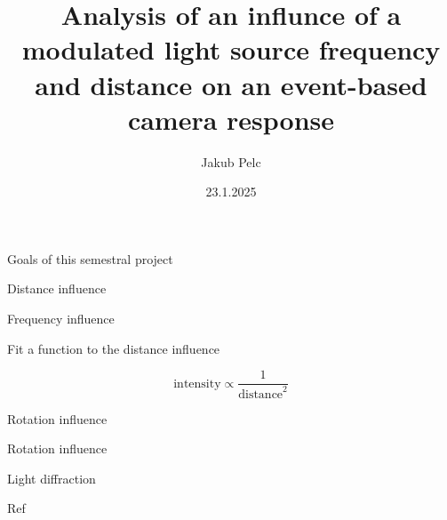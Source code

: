 \documentclass{beamer}
\title{Analysis of an influnce of a modulated light source frequency
and distance on an event-based camera response}
\date{23.1.2025}
\author{Jakub Pelc}
\institute{Faculty of Electrical Engineering, Czech Technical University in Prague}
\begin{document}
	\maketitle

	\begin{frame}{Goals of this semestral project}
	\end{frame}

	\begin{frame}{Distance influence}
	\end{frame}

	\begin{frame}{Frequency influence}
	\end{frame}

	\begin{frame}{Fit a function to the distance influence}

			$$\text{intensity} \propto \frac{1}{\text{distance}^2}$$
	\end{frame}

	\begin{frame}{Rotation influence}
	\end{frame}

	\begin{frame}{Rotation influence}
	\end{frame}

	\begin{frame}{Light diffraction}
	\end{frame}

	\begin{frame}[allowframebreaks]{Ref}
		\nocite{*}
		\setlength{\bibitemsep}{0pt}    %
		{\small                         %
			\printbibliography
		}
	\end{frame}
\end{document}

